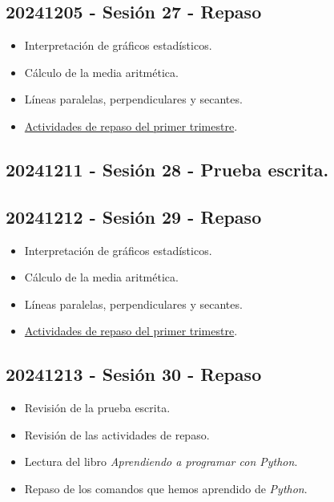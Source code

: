\documentclass[a4paper,12pt]{article}
\begin{document}
\subsection{20241205 - Sesión 27 - Repaso}

\begin{itemize}
    \item Interpretación de gráficos estadísticos.
    \item Cálculo de la media aritmética.
    \item Líneas paralelas, perpendiculares y secantes.
    \item \href{https://sarcior.com/Matematicas5/RepasoT1.pdf}{Actividades de repaso del primer trimestre}.
\end{itemize}

\subsection{20241211 - Sesión 28 - Prueba escrita.}

\subsection{20241212 - Sesión 29 - Repaso}

\begin{itemize}
    \item Interpretación de gráficos estadísticos.
    \item Cálculo de la media aritmética.
    \item Líneas paralelas, perpendiculares y secantes.
    \item \href{https://sarcior.com/Matematicas5/RepasoT1.pdf}{Actividades de repaso del primer trimestre}.
\end{itemize}

\subsection{20241213 - Sesión 30 - Repaso}

\begin{itemize}
    \item Revisión de la prueba escrita.
    \item Revisión de las actividades de repaso.
    \item Lectura del libro \textit{Aprendiendo a programar con Python}.
    \item Repaso de los comandos que hemos aprendido de \textit{Python}.
\end{itemize}
\end{document}
